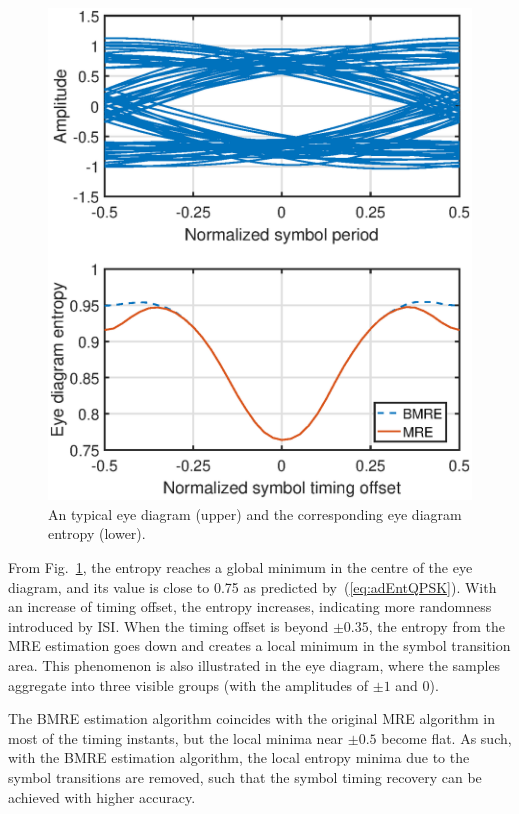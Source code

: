 \documentclass[journal,comsoc, onecolumn, 12pt,draftclsnofoot]{IEEEtran} %
\begin{document}
\begin{figure}[htbp]
\centering
\includegraphics[width=3 in]{pic/timing.eps}
\caption{An typical eye diagram (upper) and the corresponding eye diagram entropy (lower).}
\label{fig:timing} 
\end{figure}

From Fig.~\ref{fig:timing}, the entropy reaches a global minimum in the centre of the eye diagram, and its value is close to 0.75 as predicted by~(\ref{eq:adEntQPSK}).
With an increase of timing offset, the entropy increases, indicating  more randomness introduced by ISI.
When the timing offset is beyond $\pm 0.35$, the  entropy from the MRE estimation goes down and creates a local minimum in the symbol transition area. 
This phenomenon is also illustrated in the eye diagram, where the samples aggregate into three visible groups (with the amplitudes of \(\pm 1\) and 0).

The BMRE estimation algorithm coincides with the original MRE algorithm in most of the timing instants, but the local minima near $\pm0.5$ become flat.
As such, with the BMRE estimation algorithm, the local entropy minima due to the symbol transitions are removed, such that the symbol timing recovery can be achieved with higher accuracy.
\end{document}
